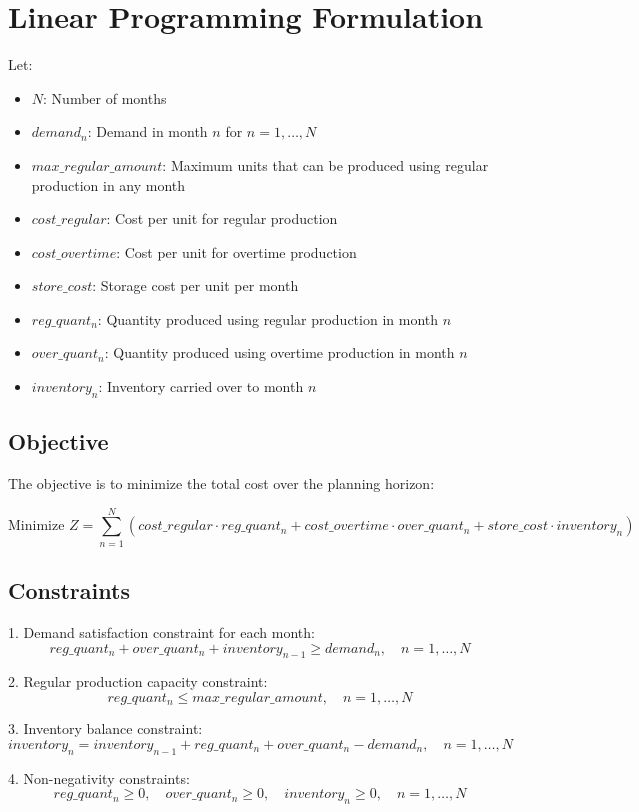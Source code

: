 \documentclass{article}
\begin{document}
\section*{Linear Programming Formulation}

Let:
\begin{itemize}
    \item $N$: Number of months
    \item $demand_n$: Demand in month $n$ for $n = 1, \ldots, N$
    \item $max\_regular\_amount$: Maximum units that can be produced using regular production in any month
    \item $cost\_regular$: Cost per unit for regular production
    \item $cost\_overtime$: Cost per unit for overtime production
    \item $store\_cost$: Storage cost per unit per month
    \item $reg\_quant_n$: Quantity produced using regular production in month $n$
    \item $over\_quant_n$: Quantity produced using overtime production in month $n$
    \item $inventory_n$: Inventory carried over to month $n$
\end{itemize}

\subsection*{Objective}
The objective is to minimize the total cost over the planning horizon:

\[
\text{Minimize } Z = \sum_{n=1}^{N} \left( cost\_regular \cdot reg\_quant_n + cost\_overtime \cdot over\_quant_n + store\_cost \cdot inventory_n \right)
\]

\subsection*{Constraints}
1. Demand satisfaction constraint for each month:
\[
reg\_quant_n + over\_quant_n + inventory_{n-1} \geq demand_n, \quad n = 1, \ldots, N
\]

2. Regular production capacity constraint:
\[
reg\_quant_n \leq max\_regular\_amount, \quad n = 1, \ldots, N
\]

3. Inventory balance constraint:
\[
inventory_n = inventory_{n-1} + reg\_quant_n + over\_quant_n - demand_n, \quad n = 1, \ldots, N
\]

4. Non-negativity constraints:
\[
reg\_quant_n \geq 0, \quad over\_quant_n \geq 0, \quad inventory_n \geq 0, \quad n = 1, \ldots, N
\]
\end{document}
